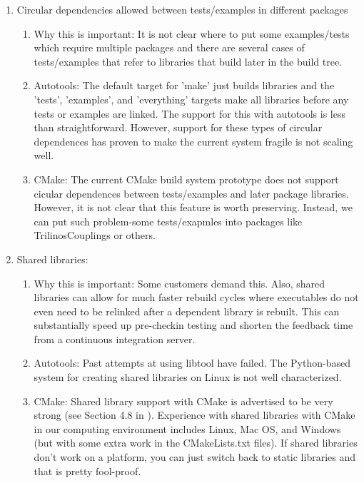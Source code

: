 \documentclass[pdf,ps2pdf,11pt]{SANDreport}
\begin{document}
\begin{enumerate}

{}\item Circular dependencies allowed between tests/examples in
different packages

  \begin{enumerate}

  {}\item Why this is important: It is not clear where to put some
  examples/tests which require multiple packages and there are
  several cases of tests/examples that refer to libraries that build
  later in the build tree.

  {}\item Autotools: The default target for 'make' just builds
  libraries and the 'tests', 'examples', and 'everything' targets make
  all libraries before any tests or examples are linked.  The support
  for this with autotools is less than straightforward.  However,
  support for these types of circular dependences has proven to make
  the current system fragile is not scaling well.

  {}\item CMake: The current CMake build system prototype does not
  support cicular dependences between tests/examples and later package
  libraries.  However, it is not clear that this feature is worth
  preserving.  Instead, we can put such problem-some tests/exapmles
  into packages like TrilinosCouplings or others.

  \end{enumerate}

{}\item Shared libraries:

  \begin{enumerate}

  {}\item Why this is important: Some customers demand this.  Also,
  shared libraries can allow for much faster rebuild cycles where
  executables do not even need to be relinked after a dependent
  library is rebuilt.  This can substantially speed up pre-checkin
  testing and shorten the feedback time from a continuous
  integration server.

  {}\item Autotools: Past attempts at using libtool have failed.
  The Python-based system for creating shared libraries on Linux is
  not well characterized.

  {}\item CMake: Shared library support with CMake is advertised to be
  very strong (see Section 4.8 in {}\cite{MasteringCMake_fourth}).
  Experience with shared libraries with CMake in our computing
  environment includes Linux, Mac OS, and Windows (but with some extra
  work in the CMakeLists.txt files).  If shared libraries don't work
  on a platform, you can just switch back to static libraries and that
  is pretty fool-proof.
  

\end{enumerate}
\end{enumerate}
\end{document}
